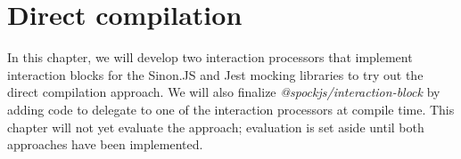 \chapter{Direct compilation}\label{chap:DirectCompilation}
In this chapter,
we will develop two interaction processors
that implement interaction blocks
for the Sinon.JS and Jest mocking libraries
to try out the direct compilation approach.
We will also finalize \textit{@spockjs/interaction-block} by adding code to
delegate to one of the interaction processors at compile time.
This chapter will not yet evaluate the approach;
evaluation is set aside until both approaches have been implemented.












